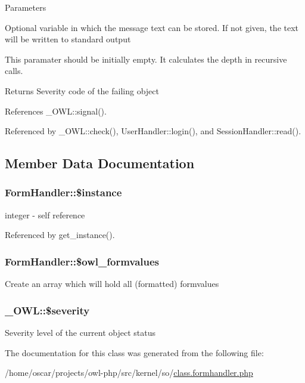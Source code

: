 \begin{DoxyParams}{Parameters}
\item[\mbox{\tt[out]} {\em \$text}]Optional variable in which the message text can be stored. If not given, the text will be written to standard output \item[\mbox{\tt[in]} {\em \$depth}]This paramater should be initially empty. It calculates the depth in recursive calls. \end{DoxyParams}
\begin{DoxyReturn}{Returns}
Severity code of the failing object 
\end{DoxyReturn}


References \_\-OWL::signal().



Referenced by \_\-OWL::check(), UserHandler::login(), and SessionHandler::read().



\subsection{Member Data Documentation}
\subsubsection[{\$instance}]{\setlength{\rightskip}{0pt plus 5cm}FormHandler::\$instance}\label{classFormHandler_a54efe3849e4065053f0eb0313356d072}
integer -\/ self reference 

Referenced by get\_\-instance().

\subsubsection[{\$owl\_\-formvalues}]{\setlength{\rightskip}{0pt plus 5cm}FormHandler::\$owl\_\-formvalues}\label{classFormHandler_a2caca98eec368ff030f07f8024253527}
Create an array which will hold all (formatted) formvalues 
\subsubsection[{\$severity}]{\setlength{\rightskip}{0pt plus 5cm}\_\-OWL::\$severity}\label{class__OWL_ad26b40a9dbbacb33e299b17826f8327c}
Severity level of the current object status 

The documentation for this class was generated from the following file:\begin{DoxyCompactItemize}
\item 
/home/oscar/projects/owl-\/php/src/kernel/so/\hyperlink{class_8formhandler_8php}{class.formhandler.php}\end{DoxyCompactItemize}
